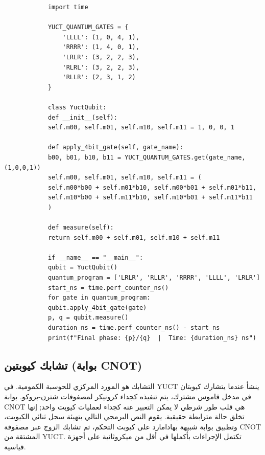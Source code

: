 \documentclass[11pt,a4paper]{article}
\begin{document}
	\begin{tcolorbox}[title=محاكي كيوبت واحد YUCT (Python), breakable]
		\begin{lstlisting}
			import time
			
			YUCT_QUANTUM_GATES = {
				'LLLL': (1, 0, 4, 1),
				'RRRR': (1, 4, 0, 1),
				'LRLR': (3, 2, 2, 3),
				'RLRL': (3, 2, 2, 3),
				'RLLR': (2, 3, 1, 2)
			}
			
			class YuctQubit:
			def __init__(self):
			self.m00, self.m01, self.m10, self.m11 = 1, 0, 0, 1
			
			def apply_4bit_gate(self, gate_name):
			b00, b01, b10, b11 = YUCT_QUANTUM_GATES.get(gate_name, (1,0,0,1))
			self.m00, self.m01, self.m10, self.m11 = (
			self.m00*b00 + self.m01*b10, self.m00*b01 + self.m01*b11,
			self.m10*b00 + self.m11*b10, self.m10*b01 + self.m11*b11
			)
			
			def measure(self):
			return self.m00 + self.m01, self.m10 + self.m11
			
			if __name__ == "__main__":
			qubit = YuctQubit()
			quantum_program = ['LRLR', 'RLLR', 'RRRR', 'LLLL', 'LRLR']
			start_ns = time.perf_counter_ns()
			for gate in quantum_program:
			qubit.apply_4bit_gate(gate)
			p, q = qubit.measure()
			duration_ns = time.perf_counter_ns() - start_ns
			print(f"Final phase: {p}/{q}  |  Time: {duration_ns} ns")
		\end{lstlisting}
	\end{tcolorbox}
	
	\subsection{تشابك كيوبتين (بوابة CNOT)}
	
	التشابك هو المورد المركزي للحوسبة الكمومية. في YUCT ينشأ عندما يتشارك كيوبتان في مدخل قاموس مشترك، يتم تنفيذه كجداء كرونيكر لمصفوفات شترن-بروكو. بوابة CNOT هي قلب طور شرطي لا يمكن التعبير عنه كجداء لعمليات كيوبت واحد; إنها تخلق حالة مترابطة حقيقية. يقوم النص البرمجي التالي بتهيئة سجل ثنائي الكيوبت، وتطبيق بوابة شبيهة بهادامارد على كيوبت التحكم، ثم تشابك الزوج عبر مصفوفة CNOT المشتقة من YUCT. تكتمل الإجراءات بأكملها في أقل من ميكروثانية على أجهزة قياسية.
	
\end{document}
